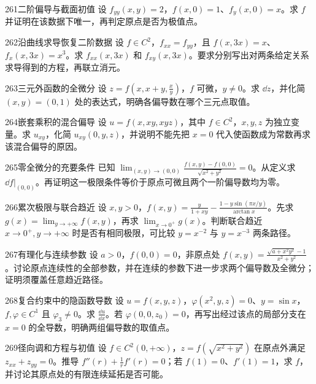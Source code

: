 \begin{exercise}{261}{二阶偏导与截面初值}
设 $f_{yy}(x,y)=2$，$f(x,0)=1$、$f_y(x,0)=x$。求 $f$ 并证明在该数据下唯一，再判定原点是否为极值点。
\end{exercise}
\begin{exercise}{262}{沿曲线求导恢复二阶数据}
设 $f\in C^2$，$f_{xx}=f_{yy}$，且 $f(x,3x)=x$、$f_x(x,3x)=x^3$。求 $f_{xx}(x,3x)$ 和 $f_{xy}(x,3x)$。要求分别写出对两条给定关系求导得到的方程，再联立消元。
\end{exercise}
\begin{exercise}{263}{三元外函数的全微分}
设 $z=f(x,x+y,\frac xy)$，$f$ 可微，$y\ne0$。求 $\dd z$，并化简 $(x,y)=(0,1)$ 处的表达式，明确各偏导数在哪个三元点取值。
\end{exercise}
\begin{exercise}{264}{嵌套乘积的混合偏导}
设 $u=f(x,xy,xyz)$，其中 $f\in C^2$，$x,y,z$ 为独立变量。求 $u_{xy}$，化简 $u_{xy}(0,y,z)$，并说明不能先把 $x=0$ 代入使函数成为常数再求该混合偏导的原因。
\end{exercise}
\begin{exercise}{265}{零全微分的充要条件}
已知 $\lim_{(x,y)\to(0,0)}\frac{f(x,y)-f(0,0)}{\sqrt{x^2+y^2}}=0$。从定义求 $\dd f|_{(0,0)}$。再证明这一极限条件等价于原点可微且两个一阶偏导数均为零。
\end{exercise}
\begin{exercise}{266}{累次极限与联合趋近}
设 $x,y>0$，$f(x,y)=\frac y{1+xy}-\frac{1-y\sin(\pi x/y)}{\arctan x}$。先求 $g(x)=\lim_{y\to+\infty}f(x,y)$，再求 $\lim_{x\to0^+}g(x)$。判断联合趋近 $x\to0^+,y\to+\infty$ 时是否有相同极限，可比较 $y=x^{-2}$ 与 $y=x^{-3}$ 两条路径。
\end{exercise}
\begin{exercise}{267}{有理化与连续参数}
设 $a>0$，$f(0,0)=0$，非原点处 $f(x,y)=\frac{\sqrt{a+x^2y^2}-1}{x^2+y^2}$。讨论原点连续性的全部参数，并在连续的参数下进一步求两个偏导数及全微分；证明须覆盖任意趋近路径。
\end{exercise}
\begin{exercise}{268}{复合约束中的隐函数导数}
设 $u=f(x,y,z)$，$\varphi(x^2,y,z)=0$、$y=\sin x$，$f,\varphi\in C^1$ 且 $\varphi_3\ne0$。求 $\frac{\dd u}{\dd x}$。若 $\varphi(0,0,z_0)=0$，再写出经过该点的局部分支在 $x=0$ 的全导数，明确两组偏导数的取值点。
\end{exercise}
\begin{exercise}{269}{径向调和方程与初值}
设 $f\in C^2(0,+\infty)$，$z=f(\sqrt{x^2+y^2})$ 在原点外满足 $z_{xx}+z_{yy}=0$。推导 $f''(r)+\frac1r f'(r)=0$；若 $f(1)=0$、$f'(1)=1$，求 $f$，并讨论其原点处的有限连续延拓是否可能。
\end{exercise}
